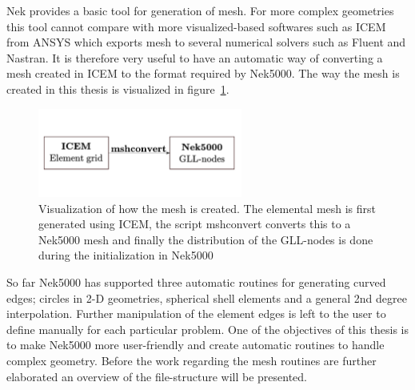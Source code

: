 
Nek provides a basic tool for generation of mesh. For more complex geometries this tool cannot compare with more visualized-based softwares 
such as ICEM from ANSYS which exports mesh to several numerical solvers such as Fluent and Nastran.
It is therefore very useful to have an automatic way of converting a mesh created in ICEM to the format required by Nek5000. 
The way the mesh is created in this thesis is visualized in figure~\ref{fig:mesh}.
%
\begin{figure}[h]
	\centering
	\includegraphics[width=0.6\textwidth]{Figures/mesh.pdf}
	\caption{Visualization of how the mesh is created. The elemental mesh is first generated using ICEM, the script mshconvert
    converts this to a Nek5000 mesh and finally the distribution of the GLL-nodes is done during the initialization in Nek5000}
	\label{fig:mesh}
\end{figure}
%

So far Nek5000 has supported three automatic routines for generating curved edges;
circles in 2-D geometries, spherical shell elements and a general 2nd degree interpolation.
Further manipulation of the element edges is left to the user to define manually
for each particular problem. One of the objectives of this thesis is to make Nek5000 more
user-friendly and create automatic routines to handle complex geometry. Before the work regarding
the mesh routines are further elaborated an overview of the file-structure will be presented.

